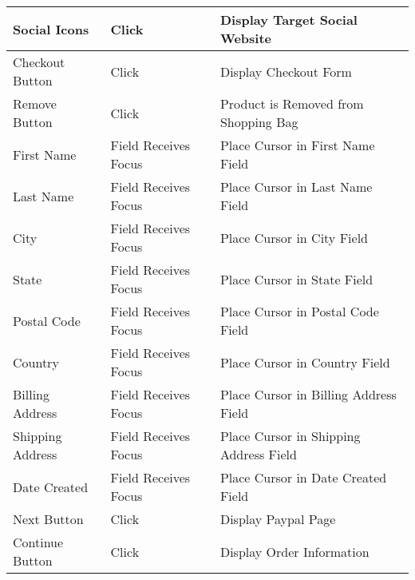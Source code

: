 \documentclass[12pt]{article}
\begin{document}
\begin{center}
	\begin{tabular}{ m{1.5in} | m{1.5in} | m{1.5in} }
	Social Icons & Click & Display Target Social Website \\
	\hline
	Checkout Button & Click & Display Checkout Form \\
	\hline
	Remove Button & Click & Product is Removed from Shopping Bag \\
	\hline
	First Name & Field Receives Focus & Place Cursor in First Name Field \\
	\hline
	Last Name & Field Receives Focus & Place Cursor in Last Name Field \\
	\hline
	City & Field Receives Focus & Place Cursor in City Field \\
	\hline
	State & Field Receives Focus & Place Cursor in State Field \\
	\hline
	Postal Code & Field Receives Focus & Place Cursor in Postal Code Field \\
	\hline
	Country & Field Receives Focus & Place Cursor in Country Field \\
	\hline
	Billing Address & Field Receives Focus & Place Cursor in Billing Address Field \\
	\hline
	Shipping Address & Field Receives Focus & Place Cursor in Shipping Address Field \\
	\hline
	Date Created & Field Receives Focus & Place Cursor in Date Created Field \\
	\hline
	Next Button & Click & Display Paypal Page \\
	\hline
	Continue Button & Click & Display Order Information \\
	
	\end{tabular}
		
	
\end{center}
\end{document}

